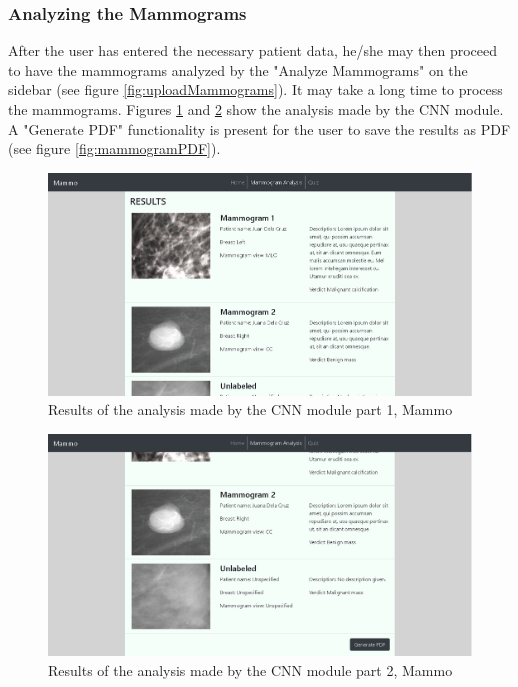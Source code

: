 \documentclass[11pt,a4paper,titlepage]{article}
\newcommand{\+}{\discretionary{\mbox{${\bm\cdot}\mkern-1mu$}}{}{}}
\begin{document}
	
	\subsubsection{Analyzing the Mammograms}
		\qquad After the user has entered the necessary patient data, he/she may then proceed to have the mammograms analyzed by the "Analyze Mammograms" on the sidebar (see figure \ref{fig:uploadMammograms}). It may take a long time to process the mammograms. Figures \ref{fig:mammogramAnalysis1} and \ref{fig:mammogramAnalysis2} show the analysis made by the CNN module. A "Generate PDF" functionality is present for the user to save the results as PDF (see figure \ref{fig:mammogramPDF}).
	
	\begin{figure}[h]
		\centering
	  	\includegraphics[scale=0.5]{images/mammoAnalysis1.png}
		 \caption{Results of the analysis made by the CNN module part 1, Mammo}
	  	\label{fig:mammogramAnalysis1}
	\end{figure}
	
	\begin{figure}[h]
		\centering
	  	\includegraphics[scale=0.5]{images/mammoAnalysis2.png}
		 \caption{Results of the analysis made by the CNN module part 2, Mammo}
	  	\label{fig:mammogramAnalysis2}
	\end{figure}
	
\end{document}
